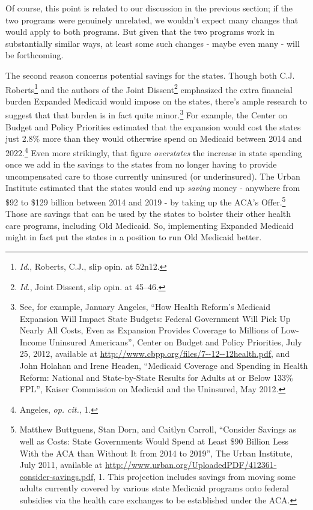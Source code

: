 \documentclass[
  11pt,
  letterpaper,
  DIV=11,
  numbers=noendperiod,
  twoside]{scrartcl}
\begin{document}
Of course, this point is related to our discussion in the previous
section; if the two programs were genuinely unrelated, we wouldn't
expect many changes that would apply to both programs. But given that
the two programs work in substantially similar ways, at least some such
changes - maybe even many - will be forthcoming.

The second reason concerns potential savings for the states. Though both
C.J. Roberts\footnote{\emph{Id}., Roberts, C.J., slip opin. at 52n12.}
and the authors of the Joint Dissent\footnote{\emph{Id.}, Joint Dissent,
  slip opin. at 45--46.} emphasized the extra financial burden Expanded
Medicaid would impose on the states, there's ample research to suggest
that that burden is in fact quite minor.\footnote{See, for example,
  January Angeles, ``How Health Reform's Medicaid Expansion Will Impact
  State Budgets: Federal Government Will Pick Up Nearly All Costs, Even
  as Expansion Provides Coverage to Millions of Low-Income Uninsured
  Americans'', Center on Budget and Policy Priorities, July 25, 2012,
  available at \url{http://www.cbpp.org/files/7--12--12health.pdf}, and
  John Holahan and Irene Headen, ``Medicaid Coverage and Spending in
  Health Reform: National and State-by-State Results for Adults at or
  Below 133\% FPL'', Kaiser Commission on Medicaid and the Uninsured,
  May 2012.} For example, the Center on Budget and Policy Priorities
estimated that the expansion would cost the states just 2.8\% more than
they would otherwise spend on Medicaid between 2014 and 2022.\footnote{Angeles,
  \emph{op. cit.}, 1.} Even more strikingly, that figure
\emph{overstates} the increase in state spending once we add in the
savings to the states from no longer having to provide uncompensated
care to those currently uninsured (or underinsured). The Urban Institute
estimated that the states would end up \emph{saving} money - anywhere
from \$92 to \$129 billion between 2014 and 2019 - by taking up the
ACA's Offer.\footnote{Matthew Buttguens, Stan Dorn, and Caitlyn Carroll,
  ``Consider Savings as well as Costs: State Governments Would Spend at
  Least \$90 Billion Less With the ACA than Without It from 2014 to
  2019'', The Urban Institute, July 2011, available at
  \url{http://www.urban.org/UploadedPDF/412361-consider-savings.pdf}, 1.
  This projection includes savings from moving some adults currently
  covered by various state Medicaid programs onto federal subsidies via
  the health care exchanges to be established under the ACA.} Those are
savings that can be used by the states to bolster their other health
care programs, including Old Medicaid. So, implementing Expanded
Medicaid might in fact put the states in a position to run Old Medicaid
better.
\end{document}
